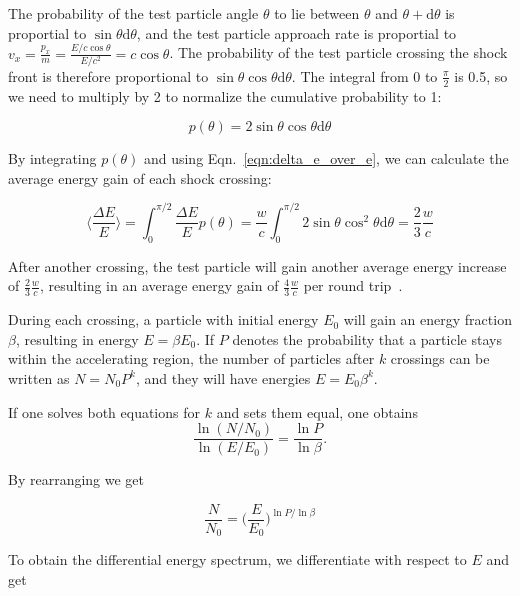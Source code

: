 The probability of the test particle angle $\theta$ to lie between $\theta$ and $\theta + \text{d}\theta$ is proportial to $\sin{\theta}\text{d}\theta$, and the test particle approach rate is proportial to $v_x = \frac{p_x}{m} = \frac{E/c\cos{\theta}}{E/c^2} = c \cos{\theta}$. The probability of the test particle crossing the shock front is therefore proportional to $\sin{\theta} \cos{\theta} \text{d}\theta$. The integral from 0 to $\frac{\pi}{2}$ is 0.5, so we need to multiply by 2 to normalize the cumulative probability to 1:

\begin{equation}
    p(\theta) = 2\sin{\theta}\cos{\theta} \text{d}\theta
\end{equation}

By integrating $p(\theta)$ and using Eqn.~\ref{eqn:delta_e_over_e}, we can calculate the average energy gain of each shock crossing:

\begin{equation}
    \bigg\langle \frac{\Delta E}{E} \bigg\rangle = \int_0^{\pi/2} \frac{\Delta E}{E} p(\theta) = \frac{w}{c} \int_0^{\pi/2} 2 \sin{\theta} \cos^2{\theta}  \text{d}\theta = \frac{2}{3}\frac{w}{c}
\end{equation}

After another crossing, the test particle will gain another average energy increase of $\frac{2}{3}\frac{w}{c}$, resulting in an average energy gain of $\frac{4}{3}\frac{w}{c}$ per round trip~\cite{Longair2011}.

During each crossing, a particle with initial energy $E_0$ will gain an energy fraction $\beta$, resulting in energy $E=\beta E_0$. If $P$ denotes the probability that a particle stays within the accelerating region, the number of particles after $k$ crossings can be written as $N=N_0 P^k $, and they will have energies $E=E_0\beta^k$.

If one solves both equations for $k$ and sets them equal, one obtains
\begin{equation}
    \frac{\ln (N/N_0)}{\ln (E/E_0)} = \frac{\ln P}{\ln \beta}.
\end{equation}

By rearranging we get

\begin{equation}
    \frac{N}{N_0} = \bigg(\frac{E}{E_0}\bigg)^{\ln P / \ln \beta}
\end{equation}

To obtain the differential energy spectrum, we differentiate with respect to $E$ and get

